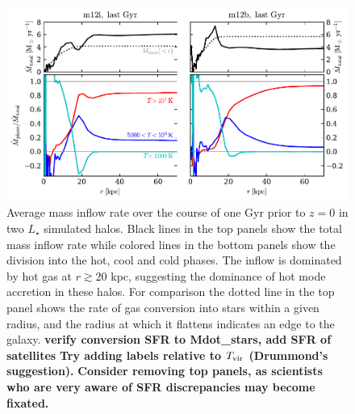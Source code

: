 \documentclass[fleqn,usenatbib]{mnras}
\newcommand{\Rvir}{R_{\rm vir}}
\begin{document}
\begin{figure}
    \centering
    \includegraphics{Mdot_normalized.pdf}
    \caption{
    Average mass inflow rate over the course of one Gyr prior to $z=0$ in two $L_\star$ simulated halos.
    Black lines in the top panels show the total mass inflow rate while colored lines in the bottom panels show the division into the hot, cool and cold phases. 
    The inflow is dominated by hot gas at $r\gtrsim 20 $ kpc, suggesting the dominance of hot mode accretion in these halos.
    For comparison the dotted line in the top panel shows the rate of gas conversion into stars within a given radius, and the radius at which it flattens indicates an edge to the galaxy.
    \textbf{verify conversion SFR to Mdot\_stars, add SFR of satellites}
    \textbf{Try adding labels relative to $T_{\rm vir}$ (Drummond's suggestion).}
    \textbf{Consider removing top panels, as scientists who are very aware of SFR discrepancies may become fixated.}
    }
    \label{f: Mdot}
\end{figure}
\end{document}
